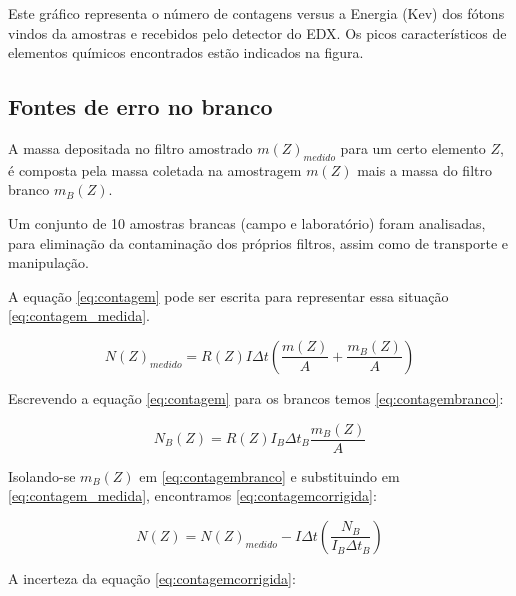 

Este gráfico representa o número de contagens  versus a Energia (Kev) dos 	fótons vindos da amostras e recebidos pelo detector do EDX. Os picos 	característicos de elementos químicos encontrados estão indicados na figura.

\subsection{Fontes de erro no branco}

A massa depositada no filtro amostrado $m(Z)_{medido}$ para um certo 
elemento $Z$, é composta pela massa coletada na amostragem $m(Z)$ 
mais a massa do filtro branco $m_{B}(Z)$. 

Um conjunto de 10 amostras brancas (campo e laboratório) foram analisadas, 
para eliminação da contaminação dos próprios filtros, assim como de 
transporte e manipulação.

A equação \ref{eq:contagem} pode ser escrita para representar essa situação
\ref{eq:contagem_medida}. 

\begin{equation}
  \label{eq:contagem_medida}
  N(Z)_{medido} = R(Z) I\Delta t \left( \frac{m(Z)}{A} + \frac{m_B(Z)}{A} \right)
\end{equation}  

Escrevendo a equação \ref{eq:contagem} para os brancos temos \ref{eq:contagembranco}:

\begin{equation}
  \label{eq:contagembranco}
  N_B(Z) = R(Z) I_B\Delta t_B \frac{m_B(Z)}{A}
\end{equation}

Isolando-se $m_B(Z)$ em \ref{eq:contagembranco} e substituindo em 
\ref{eq:contagem_medida}, encontramos \ref{eq:contagemcorrigida}:
 
\begin{equation}
  \label{eq:contagemcorrigida}
  N(Z) = N(Z)_{medido} - I\Delta t \left( \frac{N_B}{I_B \Delta t_B} \right)
\end{equation}


A incerteza da equação \ref{eq:contagemcorrigida}:

